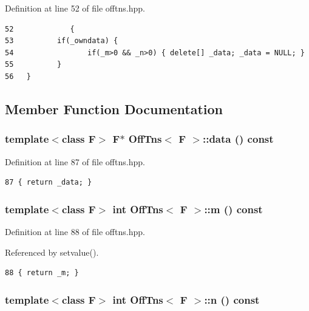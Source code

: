 Definition at line 52 of file offtns.hpp.

\footnotesize\begin{verbatim}52             { 
53          if(_owndata) { 
54                 if(_m>0 && _n>0) { delete[] _data; _data = NULL; } 
55          }
56   }
\end{verbatim}\normalsize 




\subsection{Member Function Documentation}
\subsubsection{\setlength{\rightskip}{0pt plus 5cm}template$<$class F$>$ F$\ast$ {\bf Off\-Tns}$<$ F $>$::data () const\hspace{0.3cm}{\tt  [inline]}}\label{classOffTns_ad3b2b9598c8547b4f7afe7a79ed520c_ad3b2b9598c8547b4f7afe7a79ed520c}




Definition at line 87 of file offtns.hpp.

\footnotesize\begin{verbatim}87 { return _data; }
\end{verbatim}\normalsize 


\subsubsection{\setlength{\rightskip}{0pt plus 5cm}template$<$class F$>$ int {\bf Off\-Tns}$<$ F $>$::m () const\hspace{0.3cm}{\tt  [inline]}}\label{classOffTns_6a2fa69c25bf8ed36e019d0fb3f5e966_6a2fa69c25bf8ed36e019d0fb3f5e966}




Definition at line 88 of file offtns.hpp.

Referenced by setvalue().

\footnotesize\begin{verbatim}88 { return _m; }
\end{verbatim}\normalsize 


\subsubsection{\setlength{\rightskip}{0pt plus 5cm}template$<$class F$>$ int {\bf Off\-Tns}$<$ F $>$::n () const\hspace{0.3cm}{\tt  [inline]}}\label{classOffTns_611a0b095fab035a528671dd8cf7f3b7_611a0b095fab035a528671dd8cf7f3b7}




